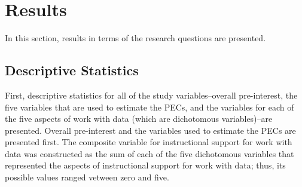 \documentclass[]{book}
\theoremstyle{definition}
\theoremstyle{definition}
\theoremstyle{definition}
\theoremstyle{remark}
\begin{document}
\chapter{Results}\label{results}

In this section, results in terms of the research questions are
presented.

\section{Descriptive Statistics}\label{descriptive-statistics}

First, descriptive statistics for all of the study variables--overall
pre-interest, the five variables that are used to estimate the PECs, and
the variables for each of the five aspects of work with data (which are
dichotomous variables)--are presented. Overall pre-interest and the
variables used to estimate the PECs are presented first. The composite
variable for instructional support for work with data was constructed as
the sum of each of the five dichotomous variables that represented the
aspects of instructional support for work with data; thus, its possible
values ranged vetween zero and five.
\end{document}
